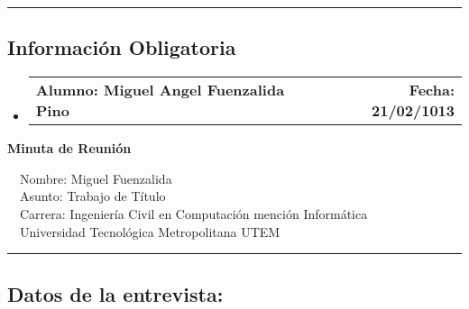 \documentclass[10pt,letterpaper]{article}
\makeatletter
\newcommand{\headerrow}[2]
{\begin{tabular*}{\linewidth}{l@{\extracolsep{\fill}}r}
	#1 &
	#2 \\
\end{tabular*}}
\makeatother
\begin{document}
\hrule
\vspace{-0.4em}
\subsection*{Información Obligatoria}

\begin{itemize}
	\parskip=0.1em

	\item 
	\headerrow
		{\textbf{Alumno: Miguel Angel Fuenzalida Pino}}
		{\textbf{Fecha: 21/02/1013}}

\end{itemize}
\newpage
\begin{center}
{\LARGE \textbf{Minuta de Reunión}}

\ \ \textbullet Nombre: Miguel Fuenzalida
\\
\ \ \textbullet Asunto: Trabajo de Título
\\
\ \ \textbullet Carrera: Ingeniería Civil en Computación mención Informática
\\
\ \ \textbullet Universidad Tecnológica Metropolitana UTEM
\end{center}

\hrule
\vspace{-0.4em}
\subsection*{Datos de la entrevista:}
\end{document}
